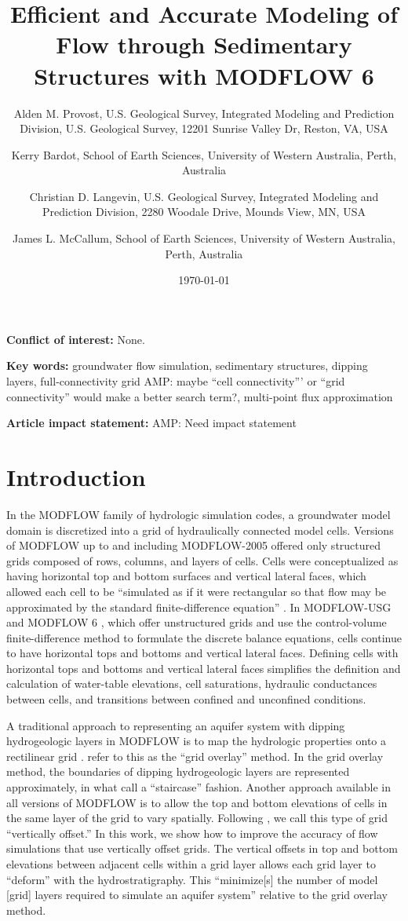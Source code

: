 \documentclass{article}
\title{Efficient and Accurate Modeling of Flow through Sedimentary Structures with MODFLOW 6}
\author{
	Alden M. Provost, U.S. Geological Survey, Integrated Modeling and Prediction Division, U.S. Geological Survey, 12201 Sunrise Valley Dr, Reston, VA, USA  \\
	\and 
	Kerry Bardot, School of Earth Sciences, University of Western Australia, Perth, Australia \\
	\and 
	Christian D. Langevin, U.S. Geological Survey, Integrated Modeling and Prediction Division, 2280 Woodale Drive, Mounds View, MN, USA \\
	\and 
	James L. McCallum, School of Earth Sciences, University of Western Australia, Perth, Australia \\
	}
\date{\today}
\begin{document}
\maketitle

\textbf{Conflict of interest:} None.

\textbf{Key words:} groundwater flow simulation, sedimentary structures, dipping layers, full-connectivity grid {\color{red} AMP: maybe ``cell connectivity''' or ``grid connectivity'' would make a better search term?}, multi-point flux approximation

\textbf{Article impact statement:} {\color{red} AMP: Need impact statement}

\begin{abstract}
\end{abstract}

\section{Introduction}

In the MODFLOW family of hydrologic simulation codes, a groundwater model domain is discretized into a grid of hydraulically connected model cells. Versions of MODFLOW up to and including MODFLOW-2005 \citep{modflow2005} offered only structured grids composed of rows, columns, and layers of cells. Cells were conceptualized as having horizontal top and bottom surfaces and vertical lateral faces, which allowed each cell to be ``simulated as if it were rectangular so that flow may be approximated by the standard finite-difference equation'' \citep{modflow84}. In MODFLOW-USG \citep{modflowusg} and MODFLOW 6 \citep{modflow6gwf}, which offer unstructured grids and use the control-volume finite-difference method to formulate the discrete balance equations, cells continue to have horizontal tops and bottoms and vertical lateral faces.  Defining cells with horizontal tops and bottoms and vertical lateral faces simplifies the definition and calculation of water-table elevations, cell saturations, hydraulic conductances between cells, and transitions between confined and unconfined conditions.

A traditional approach to representing an aquifer system with dipping hydrogeologic layers in MODFLOW is to map the hydrologic properties onto a rectilinear grid \citep{modflow84}.  \cite{hoaglund2003} refer to this as the ``grid overlay'' method.  In the grid overlay method, the boundaries of dipping hydrogeologic layers are represented approximately, in what \cite{bardot2022} call a ``staircase'' fashion.  Another approach available in all versions of MODFLOW is to allow the top and bottom elevations of cells in the same layer of the grid to vary spatially. Following \cite{bardot2022}, we call this type of grid ``vertically offset.'' In this work, we show how to improve the accuracy of flow simulations that use vertically offset grids. The vertical offsets in top and bottom elevations between adjacent cells within a grid layer allows each grid layer to ``deform'' with the hydrostratigraphy. This ``minimize[s] the number of model [grid] layers required to simulate an aquifer system'' \citep{modflow84} relative to the grid overlay method.
\end{document}
